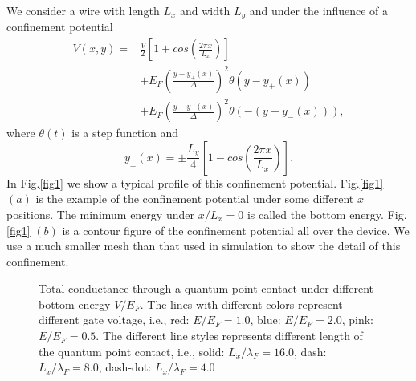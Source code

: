 \documentclass[journal]{IEEEtran}
\begin{document}
We consider a wire with length $L_x$ and width $L_y$ and under the influence of a confinement potential
\begin{equation}
    \begin{split}
        V(x,y)=&\frac{V}{2}[1+cos(\frac{2\pi x}{L_x})] \\
        &+E_F(\frac{y-y_+(x)}{\Delta})^2\theta(y-y_+(x)) \\
        &+E_F(\frac{y-y_-(x)}{\Delta})^2\theta(-(y-y_-(x))),
    \end{split}
    \label{}
\end{equation}
where $\theta(t)$ is a step function and 
\begin{equation}
    y_{\pm}(x)=\pm\frac{L_y}{4}[1-cos(\frac{2\pi x}{L_x})].
    \label{}
\end{equation}
In Fig.\ref{fig1} we show a typical profile of this confinement potential. Fig.\ref{fig1} $(a)$ is the example of the
confinement potential under some different $x$ positions. The minimum energy under $x/L_x=0$ is called the bottom
energy.  Fig.\ref{fig1} $(b)$ is a contour figure of the confinement potential all over the device. We use a much
smaller mesh than that used in simulation to show the detail of this confinement. 

\begin{figure} \centering
     \caption{Total conductance through a quantum point contact under
        different bottom energy $V/E_F$. The lines with different colors represent different gate voltage, i.e., red:
        $E/E_F=1.0$, blue: $E/E_F=2.0$, pink: $E/E_F=0.5$.  The different line styles represents different length of the
    quantum point contact, i.e., solid: $L_x/\lambda_F=16.0$, dash: $L_x/\lambda_F=8.0$, dash-dot: $L_x/\lambda_F=4.0$}
    \label{fig2}
\end{figure}
\end{document}
